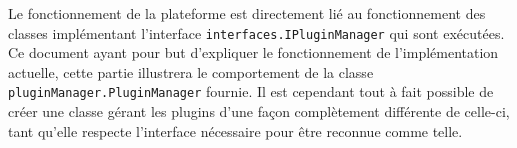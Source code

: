
Le fonctionnement de la plateforme est directement lié au fonctionnement des classes implémentant l'interface \texttt{interfaces.IPluginManager} qui sont exécutées. Ce document ayant pour but d'expliquer le fonctionnement de l'implémentation actuelle, cette partie illustrera le comportement de la classe \texttt{pluginManager.PluginManager} fournie. Il est cependant tout à fait possible de créer une classe gérant les plugins d'une façon complètement différente de celle-ci, tant qu'elle respecte l'interface nécessaire pour être reconnue comme telle.

\section{}

